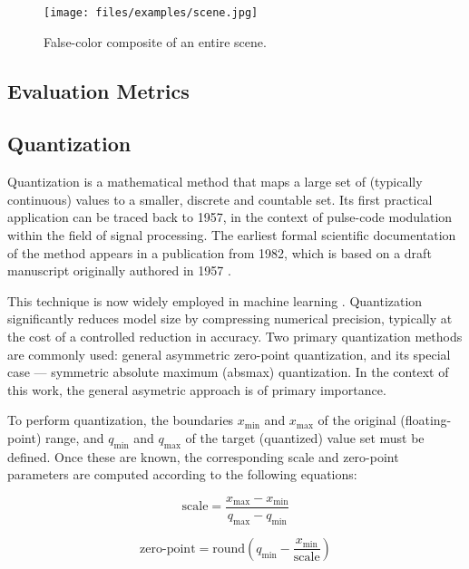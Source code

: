 {\begin{figure}[H]
  \centering
  \texttt{[image: files/examples/scene.jpg]}
  \caption{False-color composite of an entire scene.}
  \label{fig:false_color_scene}
\end{figure}

\subsection{Evaluation Metrics}
\label{subsec:evalmetrics}

\subsection{Quantization}
\label{subsec:quantization}

Quantization is a mathematical method that maps a large set of (typically continuous) values to a smaller, discrete and countable set.
Its first practical application can be traced back to 1957, in the context of pulse-code modulation within the field of signal processing.
The earliest formal scientific documentation of the method appears in a publication from 1982,
which is based on a draft manuscript originally authored in 1957 \cite{firstQuantization}.

This technique is now widely employed in machine learning \cite{MLQuantization1, MLQuantization2}.
Quantization significantly reduces model size by compressing numerical precision, typically at the cost of a controlled reduction in accuracy.
Two primary quantization methods are commonly used: general asymmetric zero-point quantization, and its special case ---
symmetric absolute maximum (absmax) quantization.
In the context of this work, the general asymetric approach is of primary importance.

To perform quantization, the boundaries \( x_{\text{min}} \) and \( x_{\text{max}} \) of the original (floating-point) range,
and \( q_{\text{min}} \) and \( q_{\text{max}} \) of the target (quantized) value set must be defined.
Once these are known, the corresponding scale and zero-point parameters are computed according to the following equations:

\begin{equation}
\text{scale} = \frac{x_{\text{max}} - x_{\text{min}}}{q_{\text{max}} - q_{\text{min}}}
\label{eq:scale}
\end{equation}

\begin{equation}
\text{zero-point} = \text{round}\left( q_{\text{min}} - \frac{x_{\text{min}}}{\text{scale}} \right)
\label{eq:zeropoint}
\end{equation}

}
